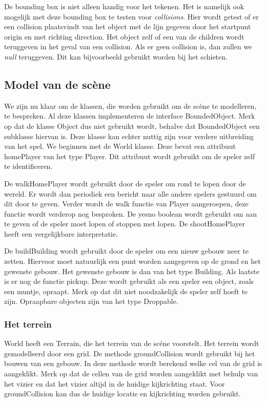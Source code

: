 \documentclass[a4paper,11pt]{article}
\begin{document}
De bounding box is niet alleen handig voor het tekenen. Het is namelijk ook mogelijk met deze bounding box te testen voor \emph{collisions}. Hier wordt getest of er een collision plaatsvindt van het object met de lijn gegeven door het startpunt origin en met richting direction. Het object zelf of een van de children wordt teruggeven in het geval van een collision. Als er geen collision is, dan zullen we \emph{null} teruggeven. Dit kan bijvoorbeeld gebruikt worden bij het schieten.

\subsection{Model van de sc\`ene}
    \label{sec:model}
We zijn nu klaar om de klassen, die worden gebruikt om de sc\`ene te modelleren, te bespreken.  Al deze klassen implementeren de interface BoundedObject. Merk op dat de klasse Object dus niet gebruikt wordt, behalve dat BoundedObject een subklasse hiervan is. Deze klasse kan echter nuttig zijn voor verdere uitbreiding van het spel. We beginnen met de World klasse. Deze bevat een attribuut homePlayer van het type Player. Dit attribuut wordt gebruikt om de speler zelf te identificeren. 

De walkHomePlayer wordt gebruikt door de speler om rond te lopen door de wereld. Er wordt dan periodiek een bericht naar alle andere spelers gestuurd om dit door te geven. Verder wordt de walk functie van Player aangeroepen, deze functie wordt verderop nog besproken. De yesno boolean wordt gebruikt om aan te geven of de speler moet lopen of stoppen met lopen. De shootHomePlayer heeft een vergelijkbare interpretatie.

De buildBuilding wordt gebruikt door de speler om een nieuw gebouw neer te zetten. Hiervoor moet natuurlijk een punt worden aangegeven op de grond en het gewenste gebouw. Het gewenste gebouw is dan van het type Building. Als laatste is er nog de functie pickup. Deze wordt gebruikt als een speler een object, zoals een muntje, opraapt. Merk op dat dit niet noodzakelijk de speler zelf hoeft te zijn. Opraapbare objecten zijn van het type Droppable. 

\subsubsection{Het terrein}
World heeft een Terrain, die het terrein van de sc\'ene voorstelt. Het terrein wordt gemodelleerd door een grid. De methode groundCollision wordt gebruikt bij het bouwen van een gebouw. In deze methode wordt berekend welke cel van de grid is aangeklikt. Merk op dat de cellen van de grid worden aangeklikt met behulp van het vizier en dat het vizier altijd in de huidige kijkrichting staat. Voor groundCollision kan dus de huidige locatie en kijkrichting worden gebruikt. 
\end{document}
